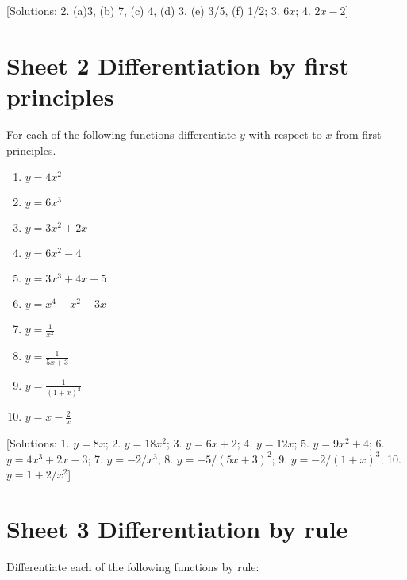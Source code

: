 \documentclass[
  11pt,
  oneside]{book}
\providecommand{\tightlist}{%
  \setlength{\itemsep}{0pt}\setlength{\parskip}{0pt}}
\newcommand{\slide}{}
\theoremstyle{definition}
\theoremstyle{definition}
\theoremstyle{definition}
\theoremstyle{definition}
\theoremstyle{remark}
\begin{document}
{[}Solutions: 2. (a)3, (b) 7, (c) 4, (d) 3, (e) 3/5, (f) 1/2; 3. \(6x\); 4. \(2x-2\){]}
\slide

\section{Sheet 2 Differentiation by first principles}\label{sheet-2-differentiation-by-first-principles}

For each of the following functions differentiate \(y\) with respect to \(x\) from first principles.

\begin{enumerate}
\def\labelenumi{\arabic{enumi}.}
\tightlist
\item
  \(y=4x^2\)
\item
  \(y=6x^3\)
\item
  \(y=3x^2+2x\)
\item
  \(y=6x^2-4\)
\item
  \(y=3x^3+4x-5\)
\item
  \(y=x^4+x^2-3x\)
\item
  \(y=\frac{1}{x^2}\)
\item
  \(y=\frac{1}{5x+3}\)
\item
  \(y=\frac{1}{(1+x)^2}\)
\item
  \(y=x-\frac{2}{x}\)
\end{enumerate}

\slide

{[}Solutions: 1. \(y=8x\); 2. \(y=18x^2\); 3. \(y=6x+2\); 4. \(y=12x\); 5. \(y=9x^2+4\); 6. \(y=4x^3+2x-3\); 7. \(y=-2/x^3\); 8. \(y=-5/(5x+3)^2\); 9. \(y=-2/(1+x)^3\); 10. \(y=1+2/x^2\){]}

\slide

\section{Sheet 3 Differentiation by rule}\label{sheet-3-differentiation-by-rule}

Differentiate each of the following functions by rule:
\end{document}
